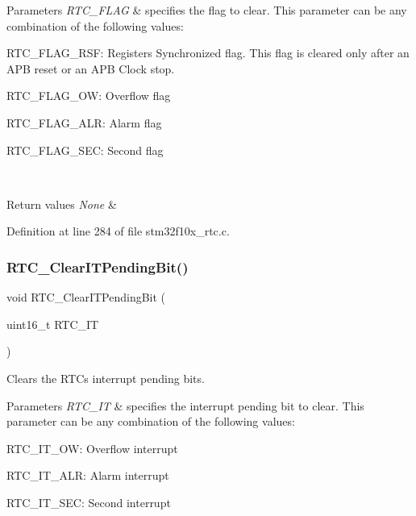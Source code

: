 \begin{DoxyParams}{Parameters}
{\em R\+T\+C\+\_\+\+F\+L\+AG} & specifies the flag to clear. This parameter can be any combination of the following values\+: \begin{DoxyItemize}
\item R\+T\+C\+\_\+\+F\+L\+A\+G\+\_\+\+R\+SF\+: Registers Synchronized flag. This flag is cleared only after an A\+PB reset or an A\+PB Clock stop. \item R\+T\+C\+\_\+\+F\+L\+A\+G\+\_\+\+OW\+: Overflow flag \item R\+T\+C\+\_\+\+F\+L\+A\+G\+\_\+\+A\+LR\+: Alarm flag \item R\+T\+C\+\_\+\+F\+L\+A\+G\+\_\+\+S\+EC\+: Second flag \end{DoxyItemize}
\\
\hline
\end{DoxyParams}

\begin{DoxyRetVals}{Return values}
{\em None} & \\
\hline
\end{DoxyRetVals}


Definition at line 284 of file stm32f10x\+\_\+rtc.\+c.

\mbox{\label{group___r_t_c___exported___functions_ga62b9a04d89a11f28db7dcfd50d9ee768}} 
\subsubsection{\texorpdfstring{R\+T\+C\+\_\+\+Clear\+I\+T\+Pending\+Bit()}{RTC\_ClearITPendingBit()}}
{\footnotesize\ttfamily void R\+T\+C\+\_\+\+Clear\+I\+T\+Pending\+Bit (\begin{DoxyParamCaption}\item[{uint16\+\_\+t}]{R\+T\+C\+\_\+\+IT }\end{DoxyParamCaption})}



Clears the R\+TC\textquotesingle{}s interrupt pending bits. 


\begin{DoxyParams}{Parameters}
{\em R\+T\+C\+\_\+\+IT} & specifies the interrupt pending bit to clear. This parameter can be any combination of the following values\+: \begin{DoxyItemize}
\item R\+T\+C\+\_\+\+I\+T\+\_\+\+OW\+: Overflow interrupt \item R\+T\+C\+\_\+\+I\+T\+\_\+\+A\+LR\+: Alarm interrupt \item R\+T\+C\+\_\+\+I\+T\+\_\+\+S\+EC\+: Second interrupt \end{DoxyItemize}
\\
\hline
\end{DoxyParams}

